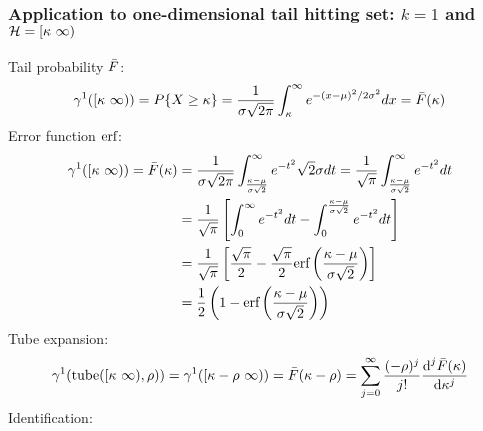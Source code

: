 \documentclass[12pt]{article}
\begin{document}
\subsubsection{Application to one-dimensional tail hitting set: $k=1$ and $\mathcal{H}=[\kappa\ \infty)$}
Tail probability $\bar{F}$:
\begin{equation}
  \gamma^1([\kappa\ \infty)) = P\{X\ge\kappa\}=\frac{1}{\sigma\sqrt{2\pi}} \int_\kappa^\infty e^{-(x-\mu)^2/2\sigma^2} dx=\bar{F}(\kappa)
\end{equation}
Error function $\text{erf}$:
\begin{subequations}
  \begin{align*}
    \gamma^1([\kappa\ \infty)) = \bar{F}(\kappa) & = \frac{1}{\sigma\sqrt{2\pi}} \int_{\frac{\kappa-\mu}{\sigma\sqrt{2}}}^\infty e^{-t^2} \sqrt{2}\sigma dt = \frac{1}{\sqrt{\pi}} \int_{\frac{\kappa-\mu}{\sigma\sqrt{2}}}^\infty e^{-t^2} dt \\
                          & = \frac{1}{\sqrt{\pi}} \left[ \int_0^\infty e^{-t^2} dt - \int_0^{\frac{\kappa-\mu}{\sigma\sqrt{2}}} e^{-t^2} dt \right]\\
                          & = \frac{1}{\sqrt{\pi}} \left[ \frac{\sqrt{\pi}}{2} - \frac{\sqrt{\pi}}{2}\text{erf}\left(\frac{\kappa-\mu}{\sigma \sqrt{2}}\right) \right]\\
                          & = \frac{1}{2}\left(1-\text{erf}\left(\frac{\kappa-\mu}{\sigma\sqrt{2}}\right)\right)
  \end{align*}
\end{subequations}
Tube expansion:
\begin{equation}
  \GaussMeas^1(\tube(\uinf,\ray))=\GaussMeas^1([\lset-\ray\ \infty))=\TP(\lset-\ray)=\sum_{j=0}^{\infty} \frac{(-\ray)^j}{j!} \frac{\text{d}^j \TP(\lset)}{\text{d} \lset^j}
\end{equation}
Identification:
\end{document}
